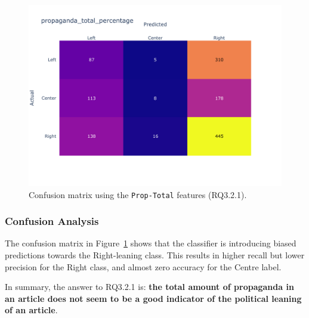 \begin{figure}[!htbp]
    \centering
    \includegraphics[trim={0.9cm 2cm 0.9cm 1cm},clip,width=0.75\linewidth]{figures/baly_media_confusion_matrix_propaganda_total_percentage.pdf}
    \caption{Confusion matrix using the \texttt{Prop-Total} features (RQ3.2.1).}
    \label{fig:total_prop_confusion}
\end{figure}

\subsubsection{Confusion Analysis}

The confusion matrix in Figure~\ref{fig:total_prop_confusion} shows that the classifier is introducing biased predictions towards the Right-leaning class. %
This results in higher recall but lower precision for the Right class, and almost zero accuracy for the Centre label. 

In summary, the answer to RQ3.2.1 is: \textbf{the total amount of propaganda in an article does not seem to be a good indicator of the political leaning of an article}.


